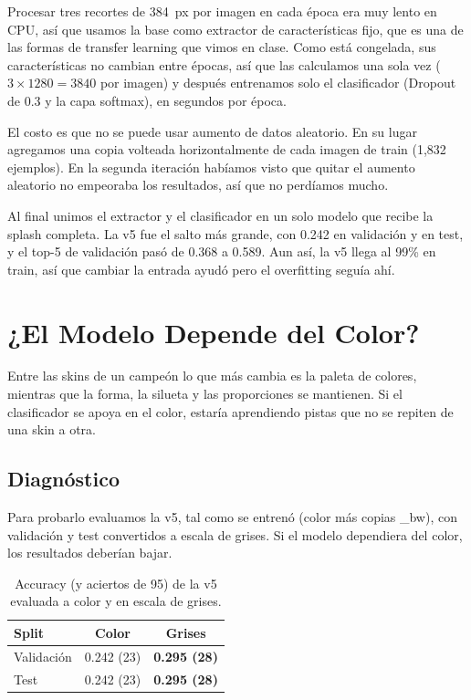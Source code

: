 \documentclass[10pt,twocolumn]{article}
\begin{document}
Procesar tres recortes de 384~px por imagen en cada época era muy lento en CPU, así que usamos la base como extractor de características fijo, que es una de las formas de transfer learning que vimos en clase. Como está congelada, sus características no cambian entre épocas, así que las calculamos una sola vez ($3\times1280 = 3840$ por imagen) y después entrenamos solo el clasificador (Dropout de 0.3 y la capa softmax), en segundos por época.

El costo es que no se puede usar aumento de datos aleatorio. En su lugar agregamos una copia volteada horizontalmente de cada imagen de train (1,832 ejemplos). En la segunda iteración habíamos visto que quitar el aumento aleatorio no empeoraba los resultados, así que no perdíamos mucho.

Al final unimos el extractor y el clasificador en un solo modelo que recibe la splash completa. La v5 fue el salto más grande, con 0.242 en validación y en test, y el top-5 de validación pasó de 0.368 a 0.589. Aun así, la v5 llega al 99\% en train, así que cambiar la entrada ayudó pero el overfitting seguía ahí.

\section{¿El Modelo Depende del Color?}

Entre las skins de un campeón lo que más cambia es la paleta de colores, mientras que la forma, la silueta y las proporciones se mantienen. Si el clasificador se apoya en el color, estaría aprendiendo pistas que no se repiten de una skin a otra.

\subsection{Diagnóstico}

Para probarlo evaluamos la v5, tal como se entrenó (color más copias \_bw), con validación y test convertidos a escala de grises. Si el modelo dependiera del color, los resultados deberían bajar.

\begin{table}[h]
  \centering
  \begin{tabular}{lcc}
    \toprule
    \textbf{Split} & \textbf{Color} & \textbf{Grises} \\
    \midrule
    Validación & 0.242 (23) & \textbf{0.295 (28)} \\
    Test       & 0.242 (23) & \textbf{0.295 (28)} \\
    \bottomrule
  \end{tabular}
  \caption{Accuracy (y aciertos de 95) de la v5 evaluada a color y en escala de grises.}
  \label{tab:grises}
\end{table}
\end{document}

